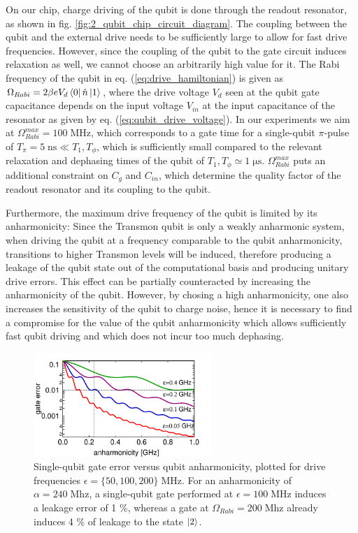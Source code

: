 On our chip, charge driving of the qubit is done through the readout resonator, as shown in fig. \ref{fig:2_qubit_chip_circuit_diagram}. The coupling between the qubit and the external drive needs to be sufficiently large to allow for fast drive frequencies. However, since the coupling of the qubit to the gate circuit induces relaxation as well, we cannot choose an arbitrarily high value for it. The Rabi frequency of the qubit in eq. (\ref{eq:drive_hamiltonian}) is given as $\Omega_{Rabi}= 2 \beta e V_d \left< 0 \right|\hat{n}\left| 1 \right>$, where the drive voltage $V_d$ seen at the qubit gate capacitance depends on the input voltage $V_{in}$ at the input capacitance of the resonator as given by eq. (\ref{eq:qubit_drive_voltage}). In our experiments we aim at $\Omega_{Rabi}^{max}=100\;\mathrm{MHz}$, which corresponds to a gate time for a single-qubit $\pi$-pulse of $T_\pi=5\;\mathrm{ns}\ll T_1,T_\phi$, which is sufficiently small compared to the relevant relaxation and dephasing times of the qubit of $T_1,T_\phi\simeq 1\;\mathrm{\mu s}$. $\Omega_{Rabi}^{max}$ puts an additional constraint on $C_{g}$ and $C_{in}$, which determine the quality factor of the readout resonator and its coupling to the qubit.

\smallskip	

Furthermore, the maximum drive frequency of the qubit is limited by its anharmonicity: Since the Transmon qubit is only a weakly anharmonic system, when driving the qubit at a frequency comparable to the qubit anharmonicity, transitions to higher Transmon levels will be induced, therefore producing a leakage of the qubit state out of the computational basis and producing unitary drive errors. This effect can be partially counteracted by increasing the anharmonicity of the qubit. However, by chosing a high anharmonicity, one also increases the sensitivity of the qubit to charge noise, hence it is necessary to find a compromise for the value of the qubit anharmonicity which allows sufficiently fast qubit driving and which does not incur too much dephasing.

\smallskip

\begin{figure}
	\centering
	\includegraphics[width=0.6\textwidth]{"./material/mathematica/three_level_driving_errors_vs_alpha"}
	\caption[]{Single-qubit gate error versus qubit anharmonicity, plotted for drive frequencies $\epsilon=\{50,100,200\}\;\mathrm{MHz}$. For an anharmonicity of $\alpha=240\;\mathrm{Mhz}$, a single-qubit gate performed at $\epsilon=100\;\mathrm{MHz}$ induces a leakage error of 1 \%, whereas a gate at $\Omega_{Rabi}=200\;\mathrm{Mhz}$ already induces 4 \% of leakage to the state $\left| 2 \right>$.}
	\label{fig:three_level_driving_errors_vs_alpha}
\end{figure}

